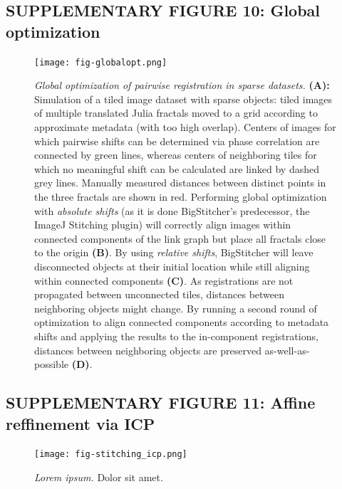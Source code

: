 \documentclass[]{spie}  %
\begin{document}
\subsection*{SUPPLEMENTARY FIGURE 10: Global optimization}
\vspace{1mm}
\begin{figure}[h!]
\centerline{\texttt{[image: fig-globalopt.png]}}
\vspace{2.0mm}
\caption{\hspace{-0.5mm} \emph{Global optimization of pairwise registration in sparse datasets.} \textbf{(A):} Simulation of a tiled image dataset with sparse objects: tiled images of multiple translated Julia fractals moved to a grid according to approximate metadata (with too high overlap). Centers of images for which pairwise shifts can be determined via phase correlation are connected by green lines, whereas centers of neighboring tiles for which no meaningful shift can be calculated are linked by dashed grey lines. Manually measured distances between distinct points in the three fractals are shown in red. Performing global optimization with \emph{absolute shifts} (as it is done BigStitcher's predecessor, the ImageJ Stitching plugin) will correctly align images within connected components of the link graph but place all fractals close to the origin \textbf{(B)}. By using \emph{relative shifts}, BigStitcher will leave disconnected objects at their initial location while still aligning within connected components \textbf{(C)}. As registrations are not propagated between unconnected tiles, distances between neighboring objects might change. By running a second round of optimization to align connected components according to metadata shifts and applying the results to the in-component registrations, distances between neighboring objects are preserved as-well-as-possible \textbf{(D)}.
}
\label{fig:sup-fig-globalopt}
\end{figure}

\pagebreak


\subsection*{SUPPLEMENTARY FIGURE 11: Affine reffinement via ICP}
\vspace{1mm}
\begin{figure}[h!]
\texttt{[image: fig-stitching\_icp.png]}
\vspace{-2.0mm}
\caption{\hspace{-0.5mm} \emph{Lorem ipsum.} Dolor sit amet.
}
\label{fig:sup-fig-icp}
\end{figure}
\end{document}
